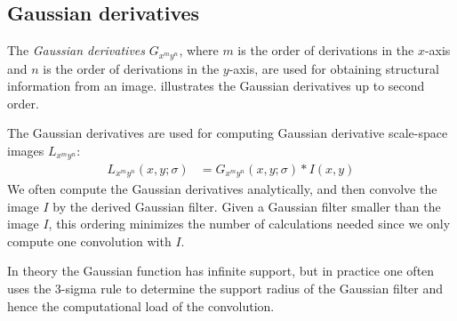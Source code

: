 \documentclass[thesis.tex]{subfiles}
\begin{document}
\subsection{Gaussian derivatives}
\label{sec:gaussianDerivatives}

The \emph{Gaussian derivatives} $G_{x^m y^n}$, where $m$ is the order of derivations in the $x$-axis and $n$ is the order of derivations in the $y$-axis, are used for obtaining structural information from an image.  illustrates the Gaussian derivatives up to second order.

The Gaussian derivatives are used for computing Gaussian derivative scale-space images $L_{x^m y^n}$:
\begin{align}
	L_{x^m y^n}(x,y;\sigma) &= G_{x^m y^n}(x,y;\sigma) \ast I(x,y)
\end{align}
We often compute the Gaussian derivatives analytically, and then convolve the image $I$ by the derived Gaussian filter. Given a Gaussian filter smaller than the image $I$, this ordering minimizes the number of calculations needed since we only compute one convolution with $I$.

In theory the Gaussian function has infinite support, but in practice one often uses the 3-sigma rule to determine the support radius of the Gaussian filter and hence the computational load of the convolution.
\end{document}
